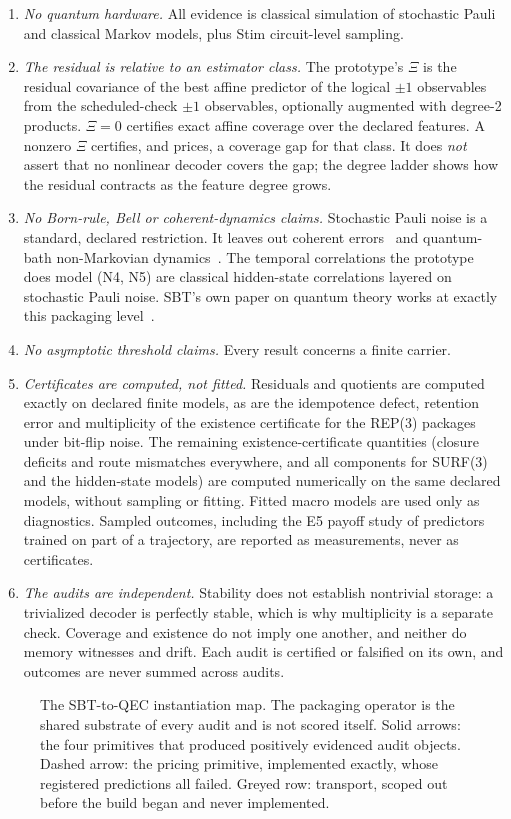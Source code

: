\begin{enumerate}
\item \emph{No quantum hardware.} All evidence is classical simulation of stochastic Pauli and classical Markov models, plus Stim circuit-level sampling.
\item \emph{The residual is relative to an estimator class.} The prototype's $\Xi$ is the residual covariance of the best affine predictor of the logical $\pm1$ observables from the scheduled-check $\pm1$ observables, optionally augmented with degree-2 products. $\Xi = 0$ certifies exact affine coverage over the declared features. A nonzero $\Xi$ certifies, and prices, a coverage gap for that class. It does \emph{not} assert that no nonlinear decoder covers the gap; the degree ladder shows how the residual contracts as the feature degree grows.
\item \emph{No Born-rule, Bell or coherent-dynamics claims.} Stochastic Pauli noise is a standard, declared restriction. It leaves out coherent errors~\cite{bravyi2018coherent} and quantum-bath non-Markovian dynamics~\cite{terhal2005nonmarkovian}. The temporal correlations the prototype does model (N4, N5) are classical hidden-state correlations layered on stochastic Pauli noise. SBT's own paper on quantum theory works at exactly this packaging level~\cite{sbt-qm}.
\item \emph{No asymptotic threshold claims.} Every result concerns a finite carrier.
\item \emph{Certificates are computed, not fitted.} Residuals and quotients are computed exactly on declared finite models, as are the idempotence defect, retention error and multiplicity of the existence certificate for the REP(3) packages under bit-flip noise. The remaining existence-certificate quantities (closure deficits and route mismatches everywhere, and all components for SURF(3) and the hidden-state models) are computed numerically on the same declared models, without sampling or fitting. Fitted macro models are used only as diagnostics. Sampled outcomes, including the E5 payoff study of predictors trained on part of a trajectory, are reported as measurements, never as certificates.
\item \emph{The audits are independent.} Stability does not establish nontrivial storage: a trivialized decoder is perfectly stable, which is why multiplicity is a separate check. Coverage and existence do not imply one another, and neither do memory witnesses and drift. Each audit is certified or falsified on its own, and outcomes are never summed across audits.
\end{enumerate}

\begin{figure}[tbp]
\centering

\caption{The SBT-to-QEC instantiation map. The packaging operator is the shared substrate of every audit and is not scored itself. Solid arrows: the four primitives that produced positively evidenced audit objects. Dashed arrow: the pricing primitive, implemented exactly, whose registered predictions all failed. Greyed row: transport, scoped out before the build began and never implemented.}%
\label{fig:map}
\end{figure}
\clearpage
